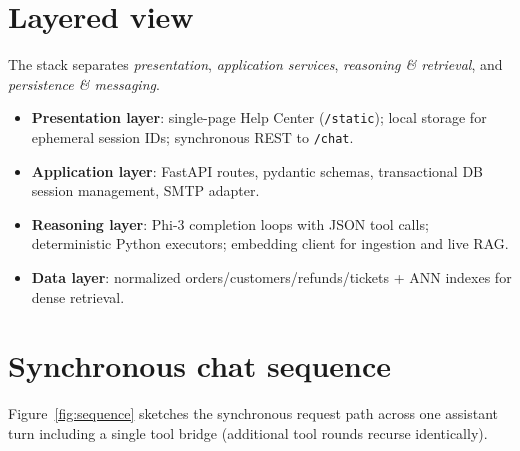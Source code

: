 \documentclass[11pt,a4paper,twoside]{report}
\begin{document}
\section{Layered view}

The stack separates \emph{presentation}, \emph{application services}, \emph{reasoning \& retrieval}, and \emph{persistence \& messaging}.

\begin{itemize}
\item \textbf{Presentation layer}: single-page Help Center (\texttt{/static}); local storage for ephemeral session IDs; synchronous REST to \texttt{/chat}.
\item \textbf{Application layer}: FastAPI routes, pydantic schemas, transactional DB session management, SMTP adapter.
\item \textbf{Reasoning layer}: Phi-3 completion loops with JSON tool calls; deterministic Python executors; embedding client for ingestion and live RAG.
\item \textbf{Data layer}: normalized orders/customers/refunds/tickets + ANN indexes for dense retrieval.
\end{itemize}

\section{Synchronous chat sequence}
Figure~\ref{fig:sequence} sketches the synchronous request path across one assistant turn including a single tool bridge (additional tool rounds recurse identically).
\end{document}

